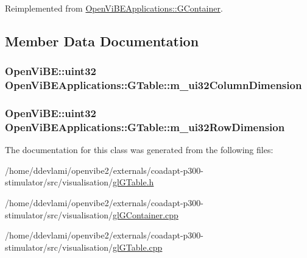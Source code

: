 Reimplemented from \hyperlink{classOpenViBEApplications_1_1GContainer_afa60cc492f0ef420e2082289b2f979e5}{OpenViBEApplications::GContainer}.



\subsection{Member Data Documentation}
\hypertarget{classOpenViBEApplications_1_1GTable_aec1ba9d4316dcbf2558c07774f9f10dc}{
\subsubsection[{m\_\-ui32ColumnDimension}]{\setlength{\rightskip}{0pt plus 5cm}OpenViBE::uint32 {\bf OpenViBEApplications::GTable::m\_\-ui32ColumnDimension}}}
\label{classOpenViBEApplications_1_1GTable_aec1ba9d4316dcbf2558c07774f9f10dc}
\hypertarget{classOpenViBEApplications_1_1GTable_ad81d25d3ed3c3f51622ab76849fd30fa}{
\subsubsection[{m\_\-ui32RowDimension}]{\setlength{\rightskip}{0pt plus 5cm}OpenViBE::uint32 {\bf OpenViBEApplications::GTable::m\_\-ui32RowDimension}}}
\label{classOpenViBEApplications_1_1GTable_ad81d25d3ed3c3f51622ab76849fd30fa}


The documentation for this class was generated from the following files:\begin{DoxyCompactItemize}
\item 
/home/ddevlami/openvibe2/externals/coadapt-\/p300-\/stimulator/src/visualisation/\hyperlink{glGTable_8h}{glGTable.h}\item 
/home/ddevlami/openvibe2/externals/coadapt-\/p300-\/stimulator/src/visualisation/\hyperlink{glGContainer_8cpp}{glGContainer.cpp}\item 
/home/ddevlami/openvibe2/externals/coadapt-\/p300-\/stimulator/src/visualisation/\hyperlink{glGTable_8cpp}{glGTable.cpp}\end{DoxyCompactItemize}
